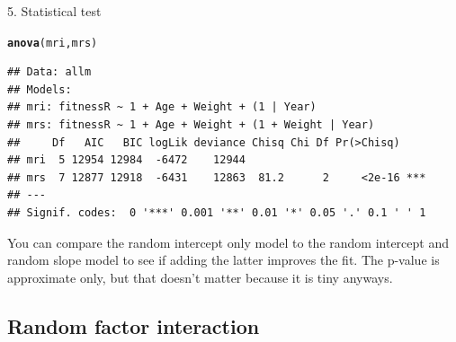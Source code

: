 \documentclass[12pt,a4paper]{scrartcl}\usepackage[]{graphicx}\usepackage[]{color}
\makeatletter
\newcommand{\hlstd}[1]{\textcolor[rgb]{0.345,0.345,0.345}{#1}}%
\newcommand{\hlkwd}[1]{\textcolor[rgb]{0.737,0.353,0.396}{\textbf{#1}}}%
\newenvironment{kframe}{%
 \def\at@end@of@kframe{}%
 \ifinner\ifhmode%
  \def\at@end@of@kframe{\end{minipage}}%
  \begin{minipage}{\columnwidth}%
 \fi\fi%
 \def\FrameCommand##1{\hskip\@totalleftmargin \hskip-\fboxsep
 \colorbox{shadecolor}{##1}\hskip-\fboxsep
     \hskip-\linewidth \hskip-\@totalleftmargin \hskip\columnwidth}%
 \MakeFramed {\advance\hsize-\width
   \@totalleftmargin\z@ \linewidth\hsize
   \@setminipage}}%
 {\par\unskip\endMakeFramed%
 \at@end@of@kframe}
\newenvironment{knitrout}{}{} %
\makeatother
\begin{document}
\begin{Answer}
\begin{knitrout}
\end{knitrout}

5. Statistical test
\begin{knitrout}
\color{fgcolor}\begin{kframe}
\begin{alltt}
\hlkwd{anova}\hlstd{(mri,mrs)}
\end{alltt}


{\ttfamily\noindent\itshape\color{messagecolor}{\#\# refitting model(s) with ML (instead of REML)}}\begin{verbatim}
## Data: allm
## Models:
## mri: fitnessR ~ 1 + Age + Weight + (1 | Year)
## mrs: fitnessR ~ 1 + Age + Weight + (1 + Weight | Year)
##     Df   AIC   BIC logLik deviance Chisq Chi Df Pr(>Chisq)    
## mri  5 12954 12984  -6472    12944                            
## mrs  7 12877 12918  -6431    12863  81.2      2     <2e-16 ***
## ---
## Signif. codes:  0 '***' 0.001 '**' 0.01 '*' 0.05 '.' 0.1 ' ' 1
\end{verbatim}
\end{kframe}
\end{knitrout}
You can compare the random intercept only model to the random intercept and random slope model to see if adding the latter improves the fit. The p-value is approximate only, but that doesn't matter because it is tiny anyways. 

\end{Answer}

\subsection{Random factor interaction}
\end{document}
